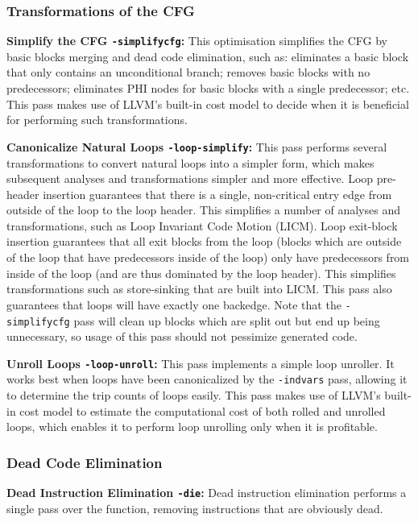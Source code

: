 \subsubsection{Transformations of the CFG}

\noindent\textbf{Simplify the CFG \texttt{-simplifycfg}:}
This optimisation simplifies the CFG by basic blocks merging and dead code elimination, such as:
eliminates a basic block that only contains an unconditional branch;
removes basic blocks with no predecessors;
eliminates PHI nodes for basic blocks with a single predecessor; etc.
This pass makes use of LLVM's built-in cost model to decide when it is beneficial for performing such transformations.

\noindent\textbf{Canonicalize Natural Loops \texttt{-loop-simplify}:}
This pass performs several transformations to convert natural loops into a simpler form, which makes subsequent analyses and transformations simpler and more effective.
Loop pre-header insertion guarantees that there is a single, non-critical entry edge from outside of the loop to the loop header.
This simplifies a number of analyses and transformations, such as Loop Invariant Code Motion (LICM).
Loop exit-block insertion guarantees that all exit blocks from the loop (blocks which are outside of the loop that have predecessors inside of the loop) only have predecessors from inside of the loop (and are thus dominated by the loop header). This simplifies transformations such as store-sinking that are built into LICM.
This pass also guarantees that loops will have exactly one backedge.
Note that the \texttt{-simplifycfg} pass will clean up blocks which are split out but end up being unnecessary, so usage of this pass should not pessimize generated code.

\noindent\textbf{Unroll Loops \texttt{-loop-unroll}:}
This pass implements a simple loop unroller.
It works best when loops have been canonicalized by the \texttt{-indvars} pass, allowing it to determine the trip counts of loops easily.
This pass makes use of LLVM's built-in cost model to estimate the computational cost of both rolled and unrolled loops, which enables it to perform loop unrolling only when it is profitable.

\subsubsection{Dead Code Elimination}

\noindent\textbf{Dead Instruction Elimination \texttt{-die}:}
Dead instruction elimination performs a single pass over the function, removing instructions that are obviously dead.

